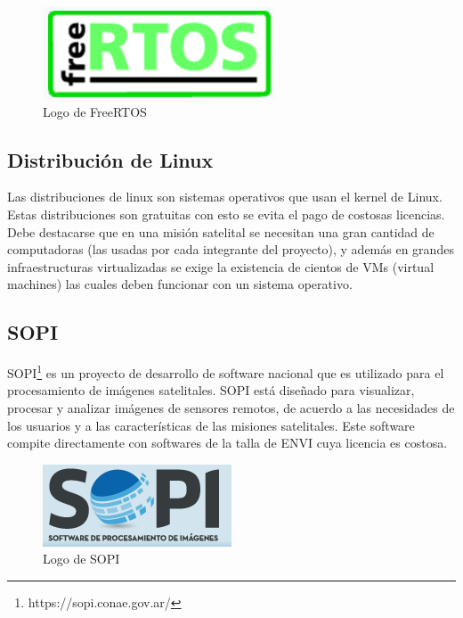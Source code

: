 \documentclass[12pt]{article}
\begin{document}
\begin{figure}[H]
	\centering
	\includegraphics[width=0.7\linewidth]{freertos}
	\caption{Logo de FreeRTOS}
	\label{fig:freertos}
\end{figure}

\subsection{Distribución de Linux}
Las distribuciones de linux son sistemas operativos que usan el kernel de Linux. Estas distribuciones son gratuitas con esto se evita el pago de costosas licencias. Debe destacarse que en una misión satelital se necesitan una gran cantidad de computadoras (las usadas por cada integrante del proyecto), y además en grandes infraestructuras virtualizadas se exige la existencia de cientos de VMs (virtual machines) las cuales deben funcionar con un sistema operativo. 

\subsection{SOPI}
SOPI\footnote{https://sopi.conae.gov.ar/} es un proyecto de desarrollo de software nacional que es utilizado para el procesamiento de imágenes satelitales. SOPI está diseñado para visualizar, procesar y analizar imágenes de sensores remotos, de acuerdo a las necesidades de los usuarios y a las características de las misiones satelitales\cite{sopi}. Este software compite directamente con softwares de la talla de ENVI cuya licencia es costosa. 

\begin{figure}[H]
	\centering
	\includegraphics[width=0.7\linewidth]{sopi}
	\caption{Logo de SOPI}
	\label{fig:sopi}
\end{figure}
\end{document}
